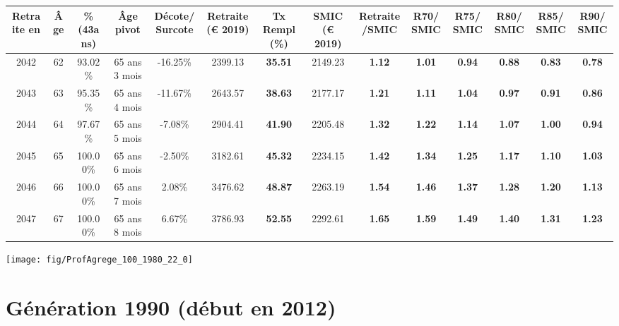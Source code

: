 \begin{adjustbox}{max width=\textwidth} 
\begin{tabular}[htb]{|c|c||c|c|c||c|c||c|c||c|c|c|c|c|} 
\hline 
 Retraite en &  Âge &  \%(43ans) &  Âge pivot &  Décote/Surcote &  Retraite (\euro{} 2019) &  Tx Rempl(\%) &  SMIC (\euro{} 2019) &  Retraite/SMIC &  R70/SMIC &  R75/SMIC &  R80/SMIC &  R85/SMIC &  R90/SMIC \\ 
\hline \hline 
 2042 &  62 &  93.02\% &  65 ans 3 mois &  -16.25\% &  2399.13 &  {\bf 35.51} &  2149.23 &  {\bf 1.12} &  {\bf 1.01} &  {\bf {\color{red} 0.94}} &  {\bf {\color{red} 0.88}} &  {\bf {\color{red} 0.83}} &  {\bf {\color{red} 0.78}} \\ 
\hline 
 2043 &  63 &  95.35\% &  65 ans 4 mois &  -11.67\% &  2643.57 &  {\bf 38.63} &  2177.17 &  {\bf 1.21} &  {\bf 1.11} &  {\bf 1.04} &  {\bf {\color{red} 0.97}} &  {\bf {\color{red} 0.91}} &  {\bf {\color{red} 0.86}} \\ 
\hline 
 2044 &  64 &  97.67\% &  65 ans 5 mois &  -7.08\% &  2904.41 &  {\bf 41.90} &  2205.48 &  {\bf 1.32} &  {\bf 1.22} &  {\bf 1.14} &  {\bf 1.07} &  {\bf 1.00} &  {\bf {\color{red} 0.94}} \\ 
\hline 
 2045 &  65 &  100.00\% &  65 ans 6 mois &  -2.50\% &  3182.61 &  {\bf 45.32} &  2234.15 &  {\bf 1.42} &  {\bf 1.34} &  {\bf 1.25} &  {\bf 1.17} &  {\bf 1.10} &  {\bf 1.03} \\ 
\hline 
 2046 &  66 &  100.00\% &  65 ans 7 mois &  2.08\% &  3476.62 &  {\bf 48.87} &  2263.19 &  {\bf 1.54} &  {\bf 1.46} &  {\bf 1.37} &  {\bf 1.28} &  {\bf 1.20} &  {\bf 1.13} \\ 
\hline 
 2047 &  67 &  100.00\% &  65 ans 8 mois &  6.67\% &  3786.93 &  {\bf 52.55} &  2292.61 &  {\bf 1.65} &  {\bf 1.59} &  {\bf 1.49} &  {\bf 1.40} &  {\bf 1.31} &  {\bf 1.23} \\ 
\hline 
\hline 
\end{tabular} 
\end{adjustbox} 
 
 \vspace{0.1cm} 

 {\hspace{-2.2cm}\texttt{[image: fig/ProfAgrege\_100\_1980\_22\_0]}} 

\newpage 
 
\section{Génération 1990 (début en 2012)\label{ProfAgrege_100_1990_22_0}} 
 
